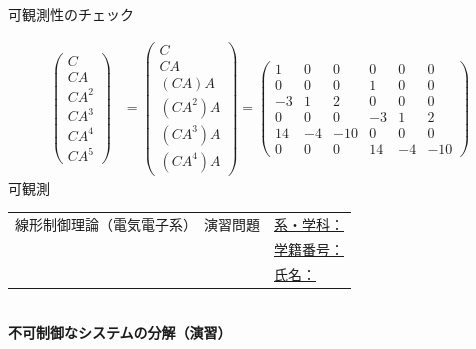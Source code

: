 \documentclass[a4paper,11pt]{jreport}
\begin{document}
可観測性のチェック

\begin{align}
 \left(\begin{array}{l}
        C \\
        CA \\
        CA^2  \\
	CA^3 \\
	CA^4 \\
	CA^5
       \end{array}\right)
 &=
 \left(\begin{array}{l}
        C \\
        CA \\
        (CA)A  \\
	(CA^2)A \\
	(CA^3)A \\
	(CA^4)A
       \end{array}\right)
 =
 \left(\begin{array}{rrrrrr}
        1 & 0 & 0 & 0 & 0 & 0      \\
        0 & 0 & 0 & 1 & 0 & 0      \\
        -3& 1 & 2 & 0 & 0 & 0      \\
	0 & 0 & 0 & -3& 1 & 2 \\
	14& -4&-10& 0 & 0 & 0 \\
	0 & 0 & 0 & 14& -4&-10
       \end{array}\right)
\nonumber
\end{align}
可観測
\newpage



\begin{tabular}{cl}
\hspace*{2cm}
{\large 線形制御理論（電気電子系）　演習問題}
\hspace{1cm}
&
\underline{系・学科：\hspace{3cm}}
\\[2mm]
&\underline{学籍番号：\hspace{3cm}}
\\[2mm]
&\underline{氏名：\hspace{5cm}}
\end{tabular}
\ \\

\noindent
{\bf 不可制御なシステムの分解（演習）}
\end{document}
